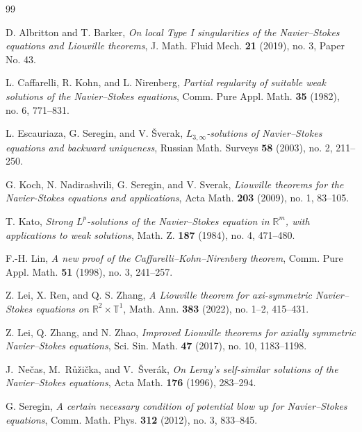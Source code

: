 \documentclass[11pt]{amsart}
\theoremstyle{plain}
\theoremstyle{definition}
\theoremstyle{remark}
\numberwithin{equation}{section}
\begin{document}
\begin{thebibliography}{99}

D. Albritton and T. Barker,
\emph{On local Type I singularities of the Navier--Stokes equations and
Liouville theorems},
J. Math. Fluid Mech. \textbf{21} (2019), no. 3, Paper No. 43.

L. Caffarelli, R. Kohn, and L. Nirenberg,
\emph{Partial regularity of suitable weak solutions of the Navier--Stokes equations},
Comm. Pure Appl. Math. \textbf{35} (1982), no. 6, 771--831.

L. Escauriaza, G. Seregin, and V. \v{S}verak,
\emph{\(L_{3,\infty}\)-solutions of Navier--Stokes equations and backward uniqueness},
Russian Math. Surveys \textbf{58} (2003), no. 2, 211--250.

G. Koch, N. Nadirashvili, G. Seregin, and V. Sverak,
\emph{Liouville theorems for the Navier-Stokes equations and applications},
Acta Math. \textbf{203} (2009), no. 1, 83--105.

T. Kato,
\emph{Strong \(L^p\)-solutions of the Navier--Stokes equation in
\(\mathbb R^m\), with applications to weak solutions},
Math. Z. \textbf{187} (1984), no. 4, 471--480.

F.-H. Lin,
\emph{A new proof of the Caffarelli--Kohn--Nirenberg theorem},
Comm. Pure Appl. Math. \textbf{51} (1998), no. 3, 241--257.

Z. Lei, X. Ren, and Q. S. Zhang,
\emph{A Liouville theorem for axi-symmetric Navier--Stokes equations on
\(\mathbb R^2\times\mathbb T^1\)},
Math. Ann. \textbf{383} (2022), no. 1--2, 415--431.

Z. Lei, Q. Zhang, and N. Zhao,
\emph{Improved Liouville theorems for axially symmetric Navier--Stokes
equations},
Sci. Sin. Math. \textbf{47} (2017), no. 10, 1183--1198.

J.~Ne\v{c}as, M.~R\r{u}\v{z}i\v{c}ka, and V.~\v{S}ver\'ak,
\emph{On Leray's self-similar solutions of the Navier--Stokes equations},
Acta Math. \textbf{176} (1996), 283--294.

G. Seregin,
\emph{A certain necessary condition of potential blow up for Navier--Stokes equations},
Comm. Math. Phys. \textbf{312} (2012), no. 3, 833--845.

\end{thebibliography}
\end{document}
